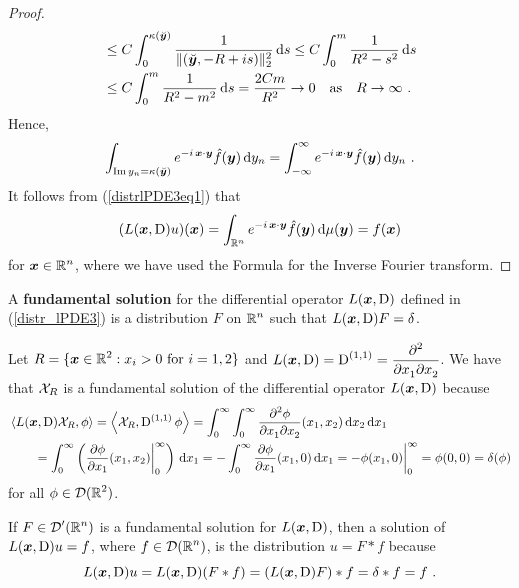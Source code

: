 \begin{proof}
\begin{align*}
&\leq C \int_0^{\kappa(\breve{\VEC{y}})}
\frac{1}{\|(\breve{\VEC{y}},-R+is)\|_2^2} \dx{s}
\leq C \int_0^m \frac{1}{ R^2 - s^2} \dx{s} \\
& \leq C \int_0^m \frac{1}{ R^2 - m^2} \dx{s}
= \frac{2Cm}{R^2} \to 0
\quad \text{as} \quad R \to \infty \ .
\end{align*}
Hence,
\[
\int_{\IM y_n = \kappa(\breve{\VEC{y}})}
e^{-i\, \VEC{x}\cdot\VEC{y}} \hat{f}(\VEC{y}) \dx{y_n}
= 
\int_{-\infty}^{\infty}
e^{-i\, \VEC{x}\cdot\VEC{y}} \hat{f}(\VEC{y}) \dx{y_n} \ .
\]
It follows from (\ref{distrlPDE3eq1}) that
\[
(L(\VEC{x},\diff)u)(\VEC{x})
= \int_{\RR^n} e^{-i\, \VEC{x}\cdot\VEC{y}} \hat{f}(\VEC{y}) \dx{\mu(\VEC{y})}
= f(\VEC{x})
\]
for $\DS \VEC{x} \in \RR^n$, where we have used the Formula for the
Inverse Fourier transform.
\end{proof}


\begin{defn}
A {\bfseries fundamental solution} for the
differential operator $L(\VEC{x},\diff)$ defined in (\ref{distr_lPDE3}) is a
distribution $F$ on $\DS \RR^n$ such that
$L(\VEC{x},\diff)F = \delta$.
\end{defn}

\begin{egg}
Let $\DS R = \{\VEC{x} \in \RR^2 : x_i > 0 \ \text{for}
\ i=1,2 \}$ and $\DS L(\VEC{x},\diff) = \diff^{(1,1)}
= \pdydxnm{}{x_1}{x_2}{2}{}{}$.  We have that
$\Chi_R$ is a fundamental solution of the differential operator
$L(\VEC{x},\diff)$ because
\begin{align*}
&\ps{L(\VEC{x},\diff) \Chi_R}{\phi}
= \ps{\Chi_R}{\diff^{(1,1)} \phi}
= \int_0^\infty \int_0^\infty \pdydxnm{\phi}{x_1}{x_2}{2}{}{}(x_1,x_2)
\dx{x_2}\dx{x_1} \\
&\qquad 
= \int_0^\infty \left( \pdydx{\phi}{x_1}(x_1,x_2) \bigg|_0^\infty\right)\dx{x_1}
= -\int_0^\infty \pdydx{\phi}{x_1}(x_1,0) \dx{x_1}
= -\phi(x_1,0) \bigg|_0^\infty = \phi(0,0) = \delta(\phi)
\end{align*}
for all $\DS \phi \in \DD(\RR^2)$.
\end{egg}

\begin{rmk}
If $\DS F\in \DD'(\RR^n)$ is a fundamental solution for
$L(\VEC{x},\diff)$, then a solution of $L(\VEC{x},\diff)u = f$, where
$\DS f \in \DD(\RR^n)$, is the 
distribution $u = F \ast f$ because
\[
L(\VEC{x},\diff) u = L(\VEC{x},\diff)(F \ast f)
= (L(\VEC{x},\diff) F) \ast f = \delta \ast f = f \ .
\]
\end{rmk}

